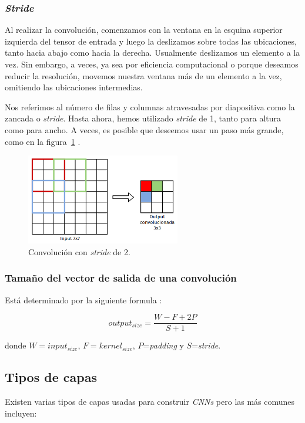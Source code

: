 \documentclass[a4paper,12pt]{article}
\begin{document}
\subsubsection{\textit{Stride}}

Al realizar la convolución, comenzamos con la ventana en la esquina superior izquierda del tensor de entrada y luego la deslizamos sobre todas las ubicaciones, tanto hacia abajo como hacia la derecha. Usualmente deslizamos un elemento a la vez. Sin embargo, a veces, ya sea por eficiencia computacional o porque deseamos reducir la resolución, movemos nuestra ventana más de un elemento a la vez, omitiendo las ubicaciones intermedias.

Nos referimos al número de filas y columnas atravesadas por diapositiva como la zancada o \textit{stride}. Hasta ahora, hemos utilizado \textit{stride} de 1, tanto para altura como para ancho. A veces, es posible que deseemos usar un paso más grande, como en la figura~\ref{fig:stride} \citep{Saha2020Oct}.

\begin{figure}[H]
	\begin{center}				
		\includegraphics[width=0.6\textwidth]{tesis_44.png}
		\caption{Convolución con \textit{stride} de 2.}
		\label{fig:stride}
	\end{center}
\end{figure}

\subsubsection{Tamaño del vector de salida de una convolución}

Está determinado por la siguiente formula \citep{SOOutputConv}:

$$ output_{size} = \frac{W-F+2P}{S+1}$$

donde $W = input_{size}$, $F=kernel_{size}$, $P$=\textit{padding} y $S$=\textit{stride}.

\subsection{Tipos de capas}
Existen varias tipos de capas usadas \citep{rosebrock2017deep} para construir \textit{CNNs} pero las más comunes incluyen:
\end{document}
